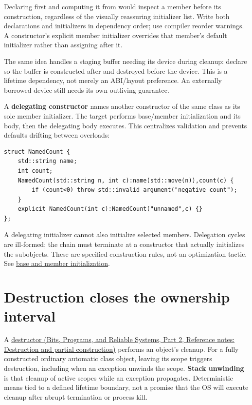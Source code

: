 Declaring  first and computing it from  would inspect a member before its construction, regardless of the visually reassuring initializer list. Write both declarations and initializers in dependency order; use compiler reorder warnings. A constructor's explicit member initializer overrides that member's default initializer rather than assigning after it.

The same idea handles a staging buffer needing its device during cleanup: declare  so the buffer is constructed after and destroyed before the device. This is a lifetime dependency, not merely an ABI/layout preference. An externally borrowed device still needs its own outliving guarantee.

A \textbf{delegating constructor} names another constructor of the same class as its sole member initializer. The target performs base/member initialization and its body, then the delegating body executes. This centralizes validation and prevents defaults drifting between overloads:

\begin{verbatim}
struct NamedCount {
    std::string name;
    int count;
    NamedCount(std::string n, int c):name(std::move(n)),count(c) {
        if (count<0) throw std::invalid_argument("negative count");
    }
    explicit NamedCount(int c):NamedCount("unnamed",c) {}
};
\end{verbatim}

A delegating initializer cannot also initialize selected members. Delegation cycles are ill-formed; the chain must terminate at a constructor that actually initializes the subobjects. These are specified construction rules, not an optimization tactic. See \href{https://eel.is/c++draft/class.base.init}{base and member initialization}.

\section{Destruction closes the ownership interval}\label{05-engine-i-ch003-destruction-closes-the-ownership-interval}

\hypertarget{05-engine-i-ch003-destruction-closes-the-ownership-interval}{}

A \href{../01-Bits-Programs-and-Reliable-Systems-P02/main.pdf\#appendix-9bfe377cef7a}{destructor (Bits, Programs, and Reliable Systems, Part 2, Reference notes: Destruction and partial construction)} performs an object's cleanup. For a fully constructed ordinary automatic class object, leaving its scope triggers destruction, including when an exception unwinds the scope. \textbf{Stack unwinding} is that cleanup of active scopes while an exception propagates. Deterministic means tied to a defined lifetime boundary, not a promise that the OS will execute cleanup after abrupt termination or process kill.

